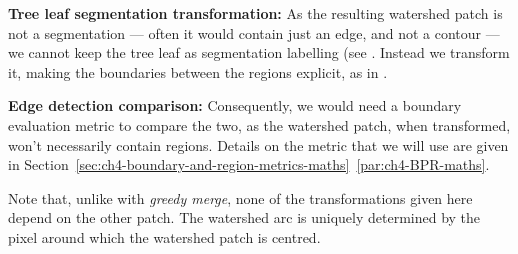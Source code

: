 \textbf{Tree leaf segmentation transformation:} As the resulting watershed patch is not a segmentation --- often it would contain just an edge, and not a contour --- we cannot keep the tree leaf as segmentation labelling (see . %
Instead we transform it, making the boundaries between the regions explicit, as in .

\textbf{Edge detection comparison:} Consequently, we would need a boundary evaluation metric to compare the two, as the watershed patch, when transformed, won't necessarily contain regions. Details on the metric that we will use are given in Section~\ref*{sec:ch4-boundary-and-region-metrics-maths}~\ref{par:ch4-BPR-maths}.

Note that, unlike with \textit{greedy merge}, none of the transformations given here depend on the other patch. The watershed arc is uniquely determined by the pixel around which the watershed patch is centred.

